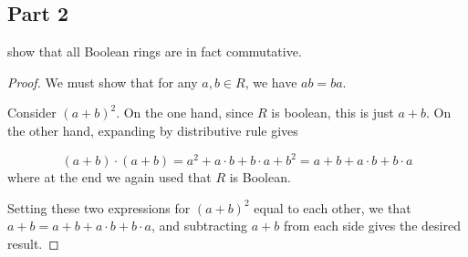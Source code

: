 \documentclass{amsart}[12pt]
\begin{document}
\subsection*{Part 2} show that all Boolean rings are in fact commutative.

\begin{proof}
We must show that for any $a,b\in R$, we have $ab=ba$.  

Consider $(a+b)^2$.  On the one hand, since $R$ is boolean, this is just $a+b$.  On the other hand, expanding by distributive rule gives

$$(a+b)\cdot(a+b)=a^2+a\cdot b+b\cdot a+b^2=a+b+a\cdot b+b\cdot a$$
where at the end we again used that $R$ is Boolean.

Setting these two expressions for $(a+b)^2$ equal to each other, we that
$a+b=a+b+a\cdot b+b\cdot a$, and subtracting $a+b$ from each side gives the desired result.

\end{proof}
\end{document}
